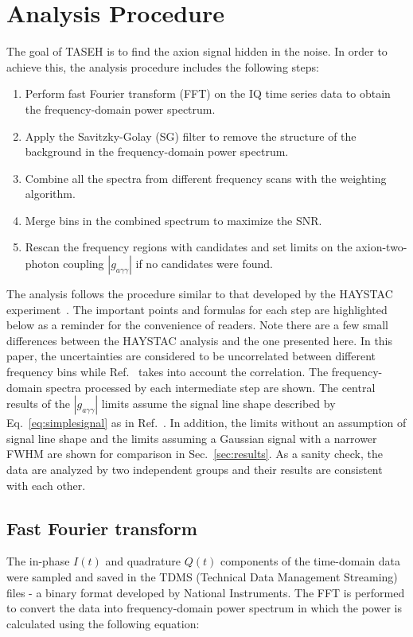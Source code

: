 \documentclass[%
reprint, %
superscriptaddress,
 amsmath,amssymb,
 aps
]{revtex4-2}
\begin{document}
\section{Analysis Procedure} \label{sec:ana}
The goal of TASEH is to find the axion signal hidden in the noise. In 
order to achieve this, the analysis procedure includes the following steps:
    \begin{enumerate}
        \item Perform fast Fourier transform (FFT) on the 
IQ time series data to obtain the frequency-domain power spectrum.
        \item Apply the Savitzky-Golay (SG) filter to remove the structure 
of the background in the frequency-domain power spectrum.
        \item Combine all the spectra from different frequency scans with 
the weighting algorithm.
        \item Merge bins in the combined spectrum to maximize the SNR. 
       \item Rescan the frequency regions with candidates and set limits on 
      the axion-two-photon coupling $\left|g_{a\gamma\gamma}\right|$ if no 
candidates were found.
    \end{enumerate}

    The analysis follows the procedure similar to that 
developed by the HAYSTAC experiment~\cite{HAYSTACII}. The important points  
and formulas for each step are highlighted below as a reminder 
for the convenience of readers. Note there are a few  
small differences between the HAYSTAC analysis and the one presented here. 
In this paper, the uncertainties are considered to be uncorrelated between 
different frequency bins while Ref.~\cite{HAYSTACII} takes into account 
the correlation. The frequency-domain spectra processed by each intermediate 
step are shown. The central results of the $\left|g_{a\gamma\gamma}\right|$ 
limits assume the signal line shape described by Eq.~\eqref{eq:simplesignal} 
as in Ref.~\cite{HAYSTACII}. In addition, the limits without an assumption of 
signal line shape and the limits assuming a 
Gaussian signal with a narrower FWHM are 
shown for comparison in Sec.~\ref{sec:results}. 
As a sanity check, the data are analyzed by two 
independent groups and their results are consistent with each other. 


\subsection{Fast Fourier transform}
\label{sec:FFT}
The in-phase $I(t)$ and quadrature $Q(t)$ components of the time-domain 
data were sampled and saved in the TDMS 
(Technical Data Management Streaming) files - a 
binary format developed by National Instruments. 
The FFT is performed to convert the data into 
frequency-domain power spectrum in which the power is calculated 
using the following equation:
\end{document}
